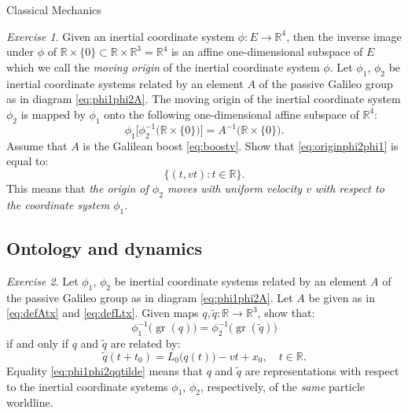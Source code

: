 \documentclass[oneside,a4paper,11pt]{amsbook}
\newcommand{\R}{\mathds R}
\DeclareMathOperator{\Gr}{gr}
\theoremstyle{remark}\newtheorem{exercise}{Exercise}[chapter]
\theoremstyle{plain}\newtheorem{teo}{Theorem}[section]
\theoremstyle{plain}\newtheorem{lem}[teo]{Lemma}
\theoremstyle{plain}\newtheorem{prop}[teo]{Proposition}
\theoremstyle{plain}\newtheorem{cor}[teo]{Corollary}
\theoremstyle{definition}\newtheorem{defin}[teo]{Definition}
\theoremstyle{remark}\newtheorem{rem}[teo]{Remark}
\theoremstyle{definition}\newtheorem{notation}[teo]{Notation}
\theoremstyle{definition}\newtheorem{convention}[teo]{Convention}
\theoremstyle{definition}\newtheorem{example}[teo]{Example}
\numberwithin{section}{chapter}
\numberwithin{equation}{section}
\begin{document}
\begin{chapter}{Classical Mechanics}
\begin{exercise}\label{exe:boosts}
Given an inertial coordinate system $\phi:E\to\R^4$, then the inverse image under $\phi$ of
$\R\times\{0\}\subset\R\times\R^3=\R^4$ is an affine one-dimensional subspace of $E$ which we call the {\em moving origin\/}
of the inertial coordinate system $\phi$. Let $\phi_1$, $\phi_2$ be inertial coordinate systems related by
an element $A$ of the passive Galileo group as in diagram \eqref{eq:phi1phi2A}.
The moving origin of the inertial coordinate system $\phi_2$ is mapped by $\phi_1$
onto the following one-dimensional affine subspace of $\R^4$:
\begin{equation}\label{eq:originphi2phi1}
\phi_1\big[\phi_2^{-1}\big(\R\times\{0\}\big)\big]=A^{-1}\big(\R\times\{0\}\big).
\end{equation}
Assume that $A$ is the Galilean boost \eqref{eq:boostv}. Show that \eqref{eq:originphi2phi1} is equal to:
\[\big\{(t,vt):t\in\R\big\}.\]
This means that {\em the origin of $\phi_2$ moves with uniform velocity $v$ with respect to the coordinate system $\phi_1$}.
\end{exercise}

\subsection*{Ontology and dynamics}

\begin{exercise}\label{exe:qtildeq}
Let $\phi_1$, $\phi_2$ be inertial coordinate systems related by
an element $A$ of the passive Galileo group as in diagram \eqref{eq:phi1phi2A}. Let $A$ be given as in
\eqref{eq:defAtx} and \eqref{eq:defLtx}.
Given maps $q,\tilde q:\R\to\R^3$, show that:
\begin{equation}\label{eq:phi1phi2qqtilde}
\phi_1^{-1}\big(\!\Gr(q)\big)=\phi_2^{-1}\big(\!\Gr(\tilde q)\big)
\end{equation}
if and only if $q$ and $\tilde q$ are related by:
\begin{equation}\label{eq:qtildeq}
\tilde q(t+t_0)=L_0\big(q(t)\big)-vt+x_0,\quad t\in\R.
\end{equation}
Equality \eqref{eq:phi1phi2qqtilde} means that $q$ and $\tilde q$ are representations with respect to the inertial
coordinate systems $\phi_1$, $\phi_2$, respectively, of the {\em same\/} particle worldline.
\end{exercise}


\end{chapter}
\end{document}
